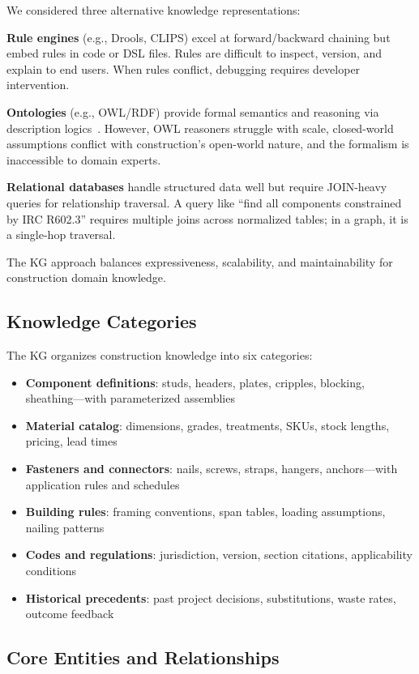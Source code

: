 We considered three alternative knowledge representations:

\textbf{Rule engines} (e.g., Drools, CLIPS) excel at forward/backward chaining but embed rules in code or DSL files.
Rules are difficult to inspect, version, and explain to end users.
When rules conflict, debugging requires developer intervention.

\textbf{Ontologies} (e.g., OWL/RDF) provide formal semantics and reasoning via description logics~\cite{pauwels2017kg_ifc}.
However, OWL reasoners struggle with scale, closed-world assumptions conflict with construction's open-world nature, and the formalism is inaccessible to domain experts.

\textbf{Relational databases} handle structured data well but require JOIN-heavy queries for relationship traversal.
A query like ``find all components constrained by IRC R602.3'' requires multiple joins across normalized tables; in a graph, it is a single-hop traversal.

The KG approach balances expressiveness, scalability, and maintainability for construction domain knowledge.

\subsection{Knowledge Categories}

The KG organizes construction knowledge into six categories:

\begin{itemize}
  \item \textbf{Component definitions}: studs, headers, plates, cripples, blocking, sheathing---with parameterized assemblies
  \item \textbf{Material catalog}: dimensions, grades, treatments, SKUs, stock lengths, pricing, lead times
  \item \textbf{Fasteners and connectors}: nails, screws, straps, hangers, anchors---with application rules and schedules
  \item \textbf{Building rules}: framing conventions, span tables, loading assumptions, nailing patterns
  \item \textbf{Codes and regulations}: jurisdiction, version, section citations, applicability conditions
  \item \textbf{Historical precedents}: past project decisions, substitutions, waste rates, outcome feedback
\end{itemize}

\subsection{Core Entities and Relationships}


